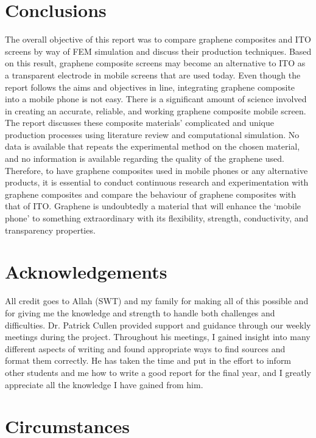 \documentclass[a4paper,12pt]{article}
\numberwithin{equation}{section}
\numberwithin{figure}{section}
\begin{document}
\newpage
\section{Conclusions}

\noindent The overall objective of this report was to compare graphene composites and ITO screens by way of FEM simulation and discuss their production techniques. Based on this result, graphene composite screens may become an alternative to ITO as a transparent electrode in mobile screens that are used today. Even though the report follows the aims and objectives in line, integrating graphene composite into a mobile phone is not easy. There is a significant amount of science involved in creating an accurate, reliable, and working graphene composite mobile screen. The report discusses these composite materials' complicated and unique production processes using literature review and computational simulation. No data is available that repeats the experimental method on the chosen material, and no information is available regarding the quality of the graphene used. Therefore, to have graphene composites used in mobile phones or any alternative products, it is essential to conduct continuous research and experimentation with graphene composites and compare the behaviour of graphene composites with that of ITO. Graphene is undoubtedly a material that will enhance the ‘mobile phone’ to something extraordinary with its flexibility, strength, conductivity, and transparency properties.

\newpage
\section*{\centering Acknowledgements}
{}

\noindent All credit goes to Allah (SWT) and my family for making all of this possible and for giving me the knowledge and strength to handle both challenges and difficulties. Dr. Patrick Cullen provided support and guidance through our weekly meetings during the project. Throughout his meetings, I gained insight into many different aspects of writing and found appropriate ways to find sources and format them correctly. He has taken the time and put in the effort to inform other students and me how to write a good report for the final year, and I greatly appreciate all the knowledge I have gained from him.

\newpage
\section*{\centering Circumstances}
{}
\end{document}
